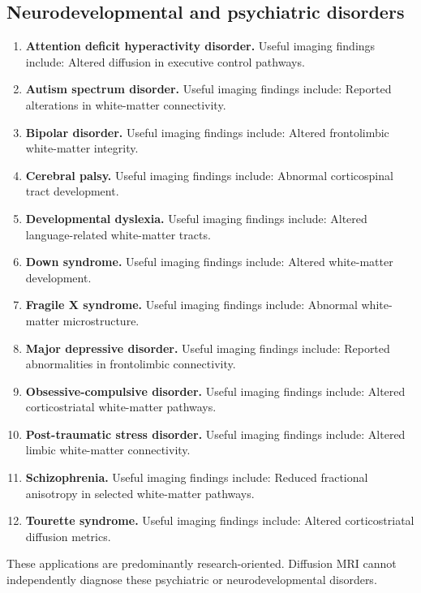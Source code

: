 \subsection{Neurodevelopmental and psychiatric disorders}
\begin{enumerate}[leftmargin=*,itemsep=0.45em,topsep=0.4em]
\item \textbf{Attention deficit hyperactivity disorder.} Useful imaging findings include: Altered diffusion in executive control pathways.
\item \textbf{Autism spectrum disorder.} Useful imaging findings include: Reported alterations in white-matter connectivity.
\item \textbf{Bipolar disorder.} Useful imaging findings include: Altered frontolimbic white-matter integrity.
\item \textbf{Cerebral palsy.} Useful imaging findings include: Abnormal corticospinal tract development.
\item \textbf{Developmental dyslexia.} Useful imaging findings include: Altered language-related white-matter tracts.
\item \textbf{Down syndrome.} Useful imaging findings include: Altered white-matter development.
\item \textbf{Fragile X syndrome.} Useful imaging findings include: Abnormal white-matter microstructure.
\item \textbf{Major depressive disorder.} Useful imaging findings include: Reported abnormalities in frontolimbic connectivity.
\item \textbf{Obsessive-compulsive disorder.} Useful imaging findings include: Altered corticostriatal white-matter pathways.
\item \textbf{Post-traumatic stress disorder.} Useful imaging findings include: Altered limbic white-matter connectivity.
\item \textbf{Schizophrenia.} Useful imaging findings include: Reduced fractional anisotropy in selected white-matter pathways.
\item \textbf{Tourette syndrome.} Useful imaging findings include: Altered corticostriatal diffusion metrics.
\end{enumerate}
These applications are predominantly research-oriented. Diffusion MRI cannot independently diagnose these psychiatric or neurodevelopmental disorders.

